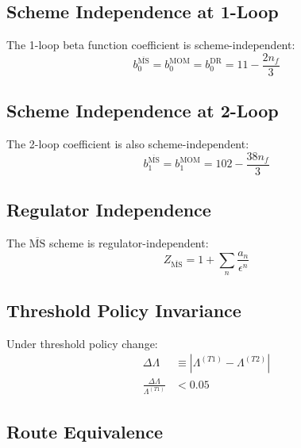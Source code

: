 \documentclass[11pt,a4paper]{article}
\theoremstyle{definition}
\begin{document}
\subsection{Scheme Independence at 1-Loop}
\label{subsec:inv-scheme-1loop}

The 1-loop beta function coefficient is scheme-independent:
\begin{equation}
\label{eq:inv-1}
b_0^{\overline{\text{MS}}} = b_0^{\text{MOM}} = b_0^{\text{DR}} = 11 - \frac{2n_f}{3}
\end{equation}

\subsection{Scheme Independence at 2-Loop}
\label{subsec:inv-scheme-2loop}

The 2-loop coefficient is also scheme-independent:
\begin{equation}
\label{eq:inv-2}
b_1^{\overline{\text{MS}}} = b_1^{\text{MOM}} = 102 - \frac{38n_f}{3}
\end{equation}

\subsection{Regulator Independence}
\label{subsec:inv-regulator}

The $\overline{\text{MS}}$ scheme is regulator-independent:
\begin{equation}
\label{eq:inv-3}
Z_{\overline{\text{MS}}} = 1 + \sum_n \frac{a_n}{\epsilon^n}
\end{equation}

\subsection{Threshold Policy Invariance}
\label{subsec:inv-threshold}

Under threshold policy change:
\begin{align}
\label{eq:inv-4}
\Delta\Lambda &\equiv |\Lambda^{(T1)} - \Lambda^{(T2)}| \\
\label{eq:inv-5}
\frac{\Delta\Lambda}{\Lambda^{(T1)}} &< 0.05
\end{align}

\subsection{Route Equivalence}
\label{subsec:inv-route}
\end{document}
